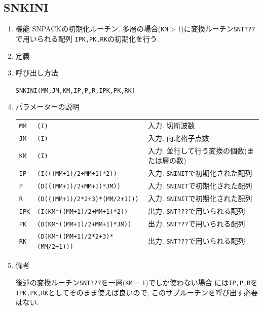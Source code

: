 \documentclass[a4j,fleqn]{jarticle}
\begin{document}

\subsection{SNKINI}

\begin{enumerate}

\item 機能 
SNPACKの初期化ルーチン. 
多層の場合({\tt KM}$>$1)に変換ルーチン{\tt SNT???}で用いられる配列
{\tt IPK,PK,RK}の初期化を行う.

\item 定義

\item 呼び出し方法 
    
{\tt SNKINI(MM,JM,KM,IP,P,R,IPK,PK,RK)}
  
\item パラメーターの説明 
    
\begin{tabular}{lll}
{\tt MM} & {\tt (I)} & 入力. 切断波数\\
{\tt JM} & {\tt (I)} & 入力. 南北格子点数\\
{\tt KM} & {\tt (I)} & 入力. 並行して行う変換の個数(または層の数)\\
{\tt IP}  & {\tt (I(((MM+1)/2+MM+1)*2))} & 入力. {\tt SNINIT}で初期化された配列\\
{\tt P}  & {\tt (D(((MM+1)/2+MM+1)*JM))} & 入力. {\tt SNINIT}で初期化された配列\\
{\tt R}  & {\tt (D(((MM+1)/2*2+3)*(MM/2+1)))} 
        & 入力. {\tt SNINIT}で初期化された配列\\
{\tt IPK}  & {\tt (I(KM*((MM+1)/2+MM+1)*2))} 
             & 出力. {\tt SNT???}で用いられる配列\\
{\tt PK}  & {\tt (D(KM*((MM+1)/2+MM+1)*JM))} 
             & 出力. {\tt SNT???}で用いられる配列\\
{\tt RK}  & {\tt (D(KM*((MM+1)/2*2+3)*(MM/2+1)))} 
        & 出力. {\tt SNT???}で用いられる配列
\end{tabular}

\item 備考

 後述の変換ルーチン{\tt SNT???}を一層({\tt KM}$=1$)でしか使わない場合
には{\tt IP,P,R}を{\tt IPK,PK,RK}としてそのまま使えば良いので,
このサブルーチンを呼び出す必要はない.

\end{enumerate}
\end{document}
